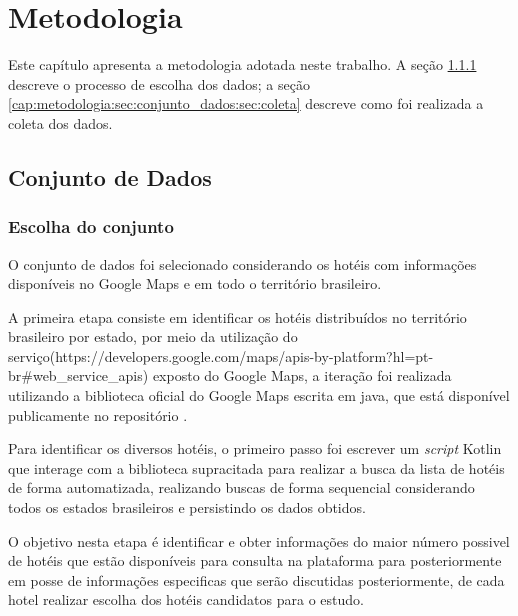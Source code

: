\chapter{Metodologia}
\label{cap:metodologia}

Este capítulo apresenta a metodologia adotada neste trabalho. A seção \ref{cap:metodologia:sec:conjunto_dados:sec:escolha_conjunto} descreve o processo de escolha dos dados; a seção \ref{cap:metodologia:sec:conjunto_dados:sec:coleta} descreve como foi realizada a coleta dos dados.


\section{Conjunto de Dados}
\label{cap:metodologia:sec:conjunto_dados}

\subsection{Escolha do conjunto}
\label{cap:metodologia:sec:conjunto_dados:sec:escolha_conjunto}

O conjunto de dados foi selecionado considerando os hotéis com informações disponíveis no Google Maps e em todo o território brasileiro.

A primeira etapa consiste em identificar os hotéis distribuídos no território brasileiro por estado, por meio da utilização do serviço(https://developers.google.com/maps/apis-by-platform?hl=pt-br#web_service_apis) exposto do Google Maps, a iteração foi realizada utilizando a biblioteca oficial do Google Maps escrita em java, que está disponível publicamente no repositório .

Para identificar os diversos hotéis, o primeiro passo foi escrever um \emph{script} Kotlin  que interage com a biblioteca supracitada para realizar a busca da lista de hotéis de forma automatizada, realizando buscas de forma sequencial considerando todos os estados brasileiros e persistindo os dados obtidos.

O objetivo nesta etapa é identificar e obter informações do maior número possivel de hotéis que estão disponíveis para consulta na plataforma para posteriormente em posse de informações especificas que serão discutidas posteriormente, de cada hotel realizar escolha dos hotéis candidatos para o estudo.

